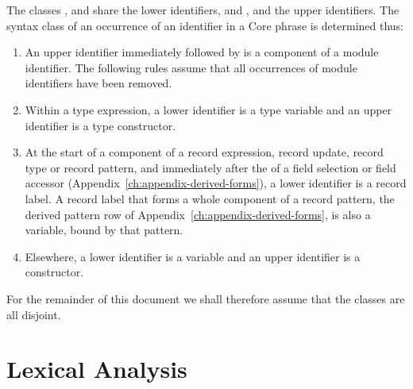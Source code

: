 The classes ,  and  share the lower identifiers,
and ,  and  the upper identifiers. The syntax
class of an occurrence of an identifier in a Core phrase is determined thus:
\begin{enumerate}
\item An upper identifier immediately followed by  is a component of a
  module identifier. The following rules assume that all occurrences of module
  identifiers have been removed.
\item Within a type expression, a lower identifier is a type variable and an
  upper identifier is a type constructor.
\item At the start of a component of a record expression, record update,
  record type or record pattern, and immediately after the  of a field
  selection or field accessor (Appendix~\ref{ch:appendix-derived-forms}), a
  lower identifier is a record label. A record label that forms a whole
  component of a record pattern, the derived pattern row of
  Appendix~\ref{ch:appendix-derived-forms}, is also a variable, bound by that
  pattern. %
\item Elsewhere, a lower identifier is a variable and an upper identifier is a
  constructor.
\end{enumerate}
For the remainder of this document we shall therefore assume that the classes
are all disjoint.

\section{Lexical Analysis}\label{sec:syntax-core-lexical}

